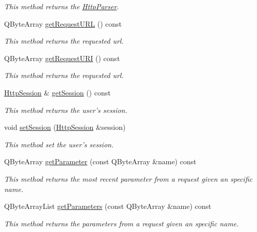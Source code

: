\begin{DoxyCompactItemize}
\begin{DoxyCompactList}\small\item\em This method returns the \hyperlink{class_c_w_f_1_1_http_parser}{Http\+Parser}. \end{DoxyCompactList}\item 
Q\+Byte\+Array \hyperlink{class_c_w_f_1_1_http_servlet_request_a9408f2866aa0fc49242e74b85a514869}{get\+Request\+U\+R\+L} () const 
\begin{DoxyCompactList}\small\item\em This method returns the requested url. \end{DoxyCompactList}\item 
Q\+Byte\+Array \hyperlink{class_c_w_f_1_1_http_servlet_request_ade6b21cdd789a5892e472915ede386fd}{get\+Request\+U\+R\+I} () const 
\begin{DoxyCompactList}\small\item\em This method returns the requested url. \end{DoxyCompactList}\item 
\hyperlink{class_c_w_f_1_1_http_session}{Http\+Session} \& \hyperlink{class_c_w_f_1_1_http_servlet_request_aad0cadb7d24101705a6f83b82eb7c025}{get\+Session} () const 
\begin{DoxyCompactList}\small\item\em This method returns the user's session. \end{DoxyCompactList}\item 
void \hyperlink{class_c_w_f_1_1_http_servlet_request_a2a613871d53495a3bacb61d68a424708}{set\+Session} (\hyperlink{class_c_w_f_1_1_http_session}{Http\+Session} \&session)
\begin{DoxyCompactList}\small\item\em This method set the user's session. \end{DoxyCompactList}\item 
Q\+Byte\+Array \hyperlink{class_c_w_f_1_1_http_servlet_request_a09c2b6f6241263a2626686e80ab6e126}{get\+Parameter} (const Q\+Byte\+Array \&name) const 
\begin{DoxyCompactList}\small\item\em This method returns the most recent parameter from a request given an specific name. \end{DoxyCompactList}\item 
Q\+Byte\+Array\+List \hyperlink{class_c_w_f_1_1_http_servlet_request_afc56e6e1a1d76c727924de6847c4ef27}{get\+Parameters} (const Q\+Byte\+Array \&name) const 
\begin{DoxyCompactList}\small\item\em This method returns the parameters from a request given an specific name. \end{DoxyCompactList}\item 

\end{DoxyCompactItemize}
